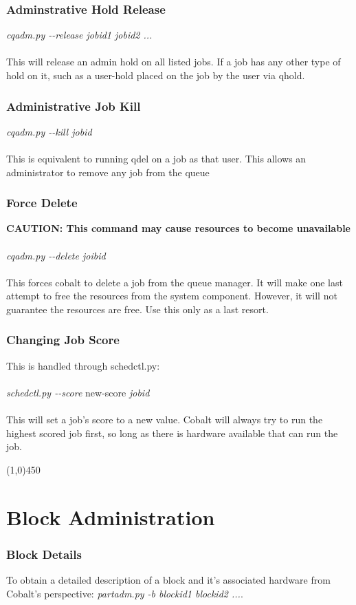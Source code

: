 \documentclass[10pt,letterpaper]{article}
\begin{document}
\subsubsection*{Adminstrative Hold Release}
\textit{cqadm.py -\--release jobid1 jobid2 ...}
\\
\\
This will release an admin hold on all listed jobs.  If a job has any other type of hold on it, such as a user-hold placed on the job by the user via qhold.
\subsubsection*{Administrative Job Kill}
\textit{cqadm.py -\--kill jobid}
\\
\\
This is equivalent to running qdel on a job as that user.  This allows an administrator to remove any job from the queue
\subsubsection*{Force Delete}
\textbf{CAUTION: This command may cause resources to become unavailable}
\\
\\
\textit{cqadm.py -\--delete joibid}
\\
\\
This forces cobalt to delete a job from the queue manager.  It will make one last attempt to free the resources from the system component.  However, it will not guarantee the resources are free. Use this only as a last resort.
\subsubsection*{Changing Job Score}
This is handled through schedctl.py:
\\
\\
\textit{schedctl.py -\--score }new-score \textit{jobid}
\\
\\
This will set a job's score to a new value.  Cobalt will always try to run the highest scored job first, so long as there is hardware available that can run the job.
\begin{center}
\line(1,0){450}
\end{center}
\section*{Block Administration}
\subsubsection*{Block Details}
To obtain a detailed description of a block and it's associated hardware from Cobalt's perspective:  \textit{partadm.py -b blockid1 blockid2 ...}.
\end{document}
